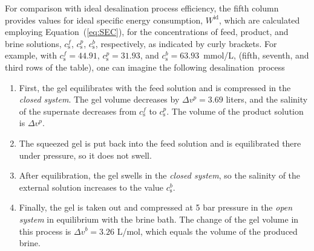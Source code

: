 \documentclass[gels,article,accept,pdftex,moreauthors]{Definitions/mdpi}
\newcommand{\cs}{c_{\mathrm{s}}}
\newcommand{\refeq}[1]{Equation~(\ref{#1}){}}
\begin{document}
For comparison with ideal desalination process efficiency, the fifth column provides values for ideal specific energy consumption, $W^\text{id}$, which are calculated employing \refeq{eq:SEC}, for the concentrations of feed, product, and brine solutions, $\cs^f$,  $\cs^p$, $\cs^b$, respectively, as indicated by curly brackets.
For example, with $\cs^f=44.91$, $\cs^p=31.93$, and $\cs^b = 63.93$~mmol/L, (fifth, seventh, and third rows of the table), one can imagine the following desalination~process
\begin{enumerate}
\item First, the gel equilibrates with the feed solution and is compressed in the \emph{closed system}.
The gel volume decreases by $\Delta v^p = 3.69$ liters, and the salinity of the supernate decreases from $\cs^f$ to $\cs^p$.
The volume of the product solution is $\Delta v^p$.
\item The squeezed gel is put back into the feed solution and is equilibrated there under pressure, so it does not swell.
\item After equilibration, the gel swells in the \emph{closed system}, so the salinity of the external solution increases to the value $\cs^b$.
\item Finally, the gel is taken out and compressed at 5 bar pressure in the \emph{open system} in equilibrium with the brine bath.
The change of the gel volume in this process is $\Delta v^b = 3.26$ L/mol, which equals the volume of the produced brine.
\end{enumerate}
\end{document}
